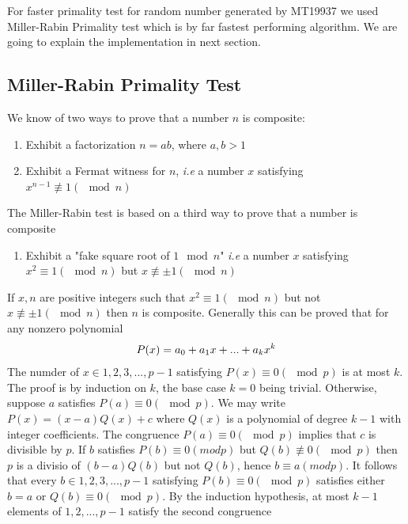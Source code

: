 \documentclass[conference]{IEEEtran}
\begin{document}
For faster primality test for random number generated by MT19937 we used Miller-Rabin Primality test which is by far fastest performing algorithm. We are going to explain the implementation in next section.

\subsection{{\large Miller-Rabin Primality Test\cite{miller-rabin}}}
We know of two ways to prove that a number $n$ is composite:
\begin{enumerate}
\item Exhibit a factorization $n = ab$, where $a,b >1$
\item Exhibit a Fermat\cite{fermat} witness for $n$, \emph{i.e} a number $x$ satisfying $x^{n-1}\not\equiv 1 (\mod n)$
\end{enumerate}
The Miller-Rabin test is based on a third way to prove that a number is composite
\begin{enumerate}[ {}3{)} ]
\item Exhibit a "fake square root of $1 \mod n$" \emph{i.e} a number $x$ satisfying $x^{2} \equiv 1(\mod n)$ but $x \not \equiv \pm1 (\mod n)$
\end{enumerate}

If $x, n$ are positive integers such that $x^{2} \equiv 1 (\mod n)$ but not $x \not \equiv \pm1 (\mod n)$ then $n$ is composite. Generally this can be proved that for any nonzero polynomial
\begin{align}
P(x) = a_0 + a_1x + ... + a_kx^k \notag
\end{align}
The numder of $x \in {1, 2, 3, ... , p-1}$ satisfying $P(x) \equiv 0 (\mod p)$ is at most $k$. The proof is by induction on $k$, the base case $k = 0$ being trivial. Otherwise, suppose $a$ satisfies $P(a) \equiv 0 (\mod p)$. We may write $P(x) = (x - a)Q(x) + c$ where $Q(x)$ is a polynomial of degree $k-1$ with integer coefficients. The congruence $P(a) \equiv 0 (\mod p)$ implies that $c$ is divisible by $p$. If $b$ satisfies $P(b) \equiv 0 (mod p)$ but $Q(b) \not \equiv 0 (\mod p)$ then $p$ is a divisio of $(b-a)Q(b)$ but not $Q(b)$, hence $b \equiv a (mod p)$. It follows that every $b \in {1,2,3,...,p-1}$ satisfying $P(b) \equiv 0 (\mod p)$ satisfies either $b = a$ or $Q(b)\equiv 0(\mod p)$. By the induction hypothesis, at most $k-1$ elements of ${1, 2,...,p-1}$ satisfy the second congruence\cite{miller-rabin}
\end{document}
